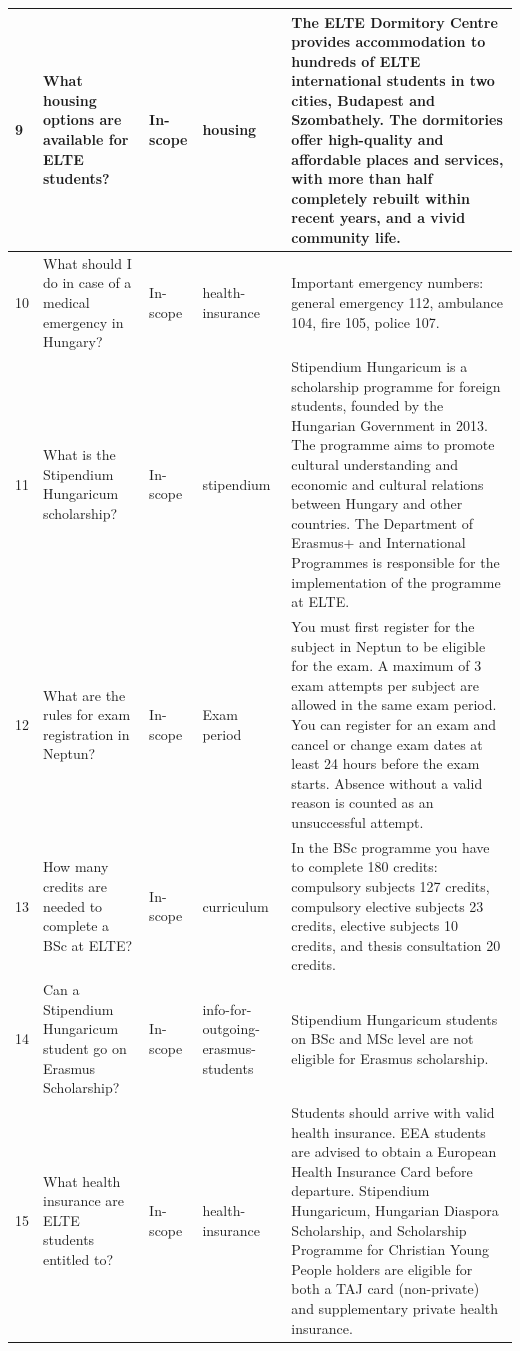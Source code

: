 \begin{longtable}{|p{}|p{}|p{}|p{}|p{}|}
    9 &
    What housing options are available for ELTE students? &
    In-scope &
    housing &
    The ELTE Dormitory Centre provides accommodation to hundreds of ELTE international students in two cities, Budapest and Szombathely. The dormitories offer high-quality and affordable places and services, with more than half completely rebuilt within recent years, and a vivid community life. \\
    \hline

    10 &
    What should I do in case of a medical emergency in Hungary? &
    In-scope &
    health-insurance &
    Important emergency numbers: general emergency 112, ambulance 104, fire 105, police 107. \\
    \hline

    11 &
    What is the Stipendium Hungaricum scholarship? &
    In-scope &
    stipendium &
    Stipendium Hungaricum is a scholarship programme for foreign students, founded by the Hungarian Government in 2013. The programme aims to promote cultural understanding and economic and cultural relations between Hungary and other countries. The Department of Erasmus+ and International Programmes is responsible for the implementation of the programme at ELTE. \\
    \hline

    12 &
    What are the rules for exam registration in Neptun? &
    In-scope &
    Exam period &
    You must first register for the subject in Neptun to be eligible for the exam. A maximum of 3 exam attempts per subject are allowed in the same exam period. You can register for an exam and cancel or change exam dates at least 24 hours before the exam starts. Absence without a valid reason is counted as an unsuccessful attempt. \\
    \hline

    13 &
    How many credits are needed to complete a BSc at ELTE? &
    In-scope &
    curriculum &
    In the BSc programme you have to complete 180 credits: compulsory subjects 127 credits, compulsory elective subjects 23 credits, elective subjects 10 credits, and thesis consultation 20 credits. \\
    \hline

    14 &
    Can a Stipendium Hungaricum student go on Erasmus Scholarship? &
    In-scope &
    info-for-outgoing- erasmus-students &
    Stipendium Hungaricum students on BSc and MSc level are not eligible for Erasmus scholarship. \\
    \hline

    15 &
    What health insurance are ELTE students entitled to? &
    In-scope &
    health-insurance &
    Students should arrive with valid health insurance. EEA students are advised to obtain a European Health Insurance Card before departure. Stipendium Hungaricum, Hungarian Diaspora Scholarship, and Scholarship Programme for Christian Young People holders are eligible for both a TAJ card (non-private) and supplementary private health insurance. \\
    \hline


\end{longtable}
